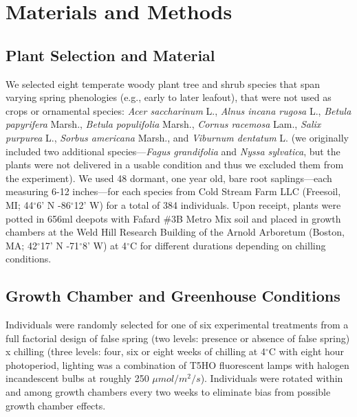 \documentclass{article}\usepackage[]{graphicx}\usepackage[]{color}
\begin{document}
\section*{Materials and Methods} %
\subsection*{Plant Selection and Material}
We selected eight temperate woody plant tree and shrub species that span varying spring phenologies (e.g., early to later leafout), that were not used as crops or ornamental species: \textit{Acer saccharinum} L., \textit{Alnus incana rugosa} L., \textit{Betula papyrifera} Marsh., \textit{Betula populifolia} Marsh., \textit{Cornus racemosa} Lam., \textit{Salix purpurea} L., \textit{Sorbus americana} Marsh., and \textit{Viburnum dentatum} L. (we originally included two additional species---\textit{Fagus grandifolia} and \textit{Nyssa sylvatica}, but the plants were not delivered in a usable condition and thus we excluded them from the experiment). We used 48 dormant, one year old, bare root saplings---each measuring 6-12 inches---for each species from Cold Stream Farm LLC (Freesoil, MI; 44$^{\circ}$6' N -86$^{\circ}$12' W) for a total of 384 individuals. Upon receipt, plants were potted in 656ml deepots with Fafard \#3B Metro Mix soil and placed in growth chambers at the Weld Hill Research Building of the Arnold Arboretum (Boston, MA; 42$^{\circ}$17' N -71$^{\circ}$8' W) at 4$^{\circ}$C for different durations depending on chilling conditions.  %

\subsection*{Growth Chamber and Greenhouse Conditions}
Individuals were randomly selected for one of six experimental treatments from a full factorial design of false spring (two levels: presence or absence of false spring) x chilling (three levels: four, six or eight weeks of chilling at 4$^{\circ}$C with eight hour photoperiod, lighting was a combination of T5HO fluorescent lamps with halogen incandescent bulbs at roughly 250 $\mu mol/m^{2}/s$). Individuals were rotated within and among growth chambers every two weeks to eliminate bias from possible growth chamber effects.
\end{document}

